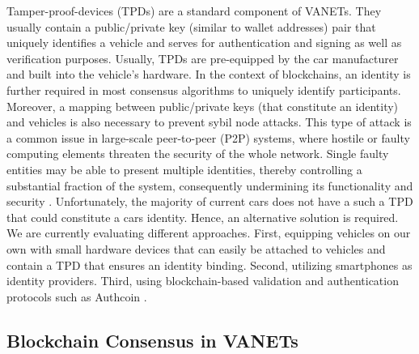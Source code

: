 \documentclass{llncs}
\begin{document}
{			Tamper-proof-devices (TPDs) are a standard component of VANETs. They usually contain a public/private key (similar to wallet addresses) pair that uniquely identifies a vehicle and serves for authentication and signing as well as verification purposes. Usually, TPDs are pre-equipped by the car manufacturer and built into the vehicle's hardware. In the context of blockchains, an identity is further required in most consensus algorithms to uniquely identify participants. Moreover, a mapping between public/private keys (that constitute an identity) and vehicles is also necessary to prevent sybil node attacks. 
			This type of attack is a common issue in large-scale peer-to-peer (P2P) systems, where hostile or faulty computing elements threaten the security of the whole network. Single faulty entities may be able to present multiple identities, thereby controlling a substantial fraction of the system, consequently undermining its functionality and security \cite{douceur2002sybil}.	
			Unfortunately, the majority of current cars does not have a such a TPD that could constitute a cars identity. Hence, an alternative solution is required. We are currently evaluating different approaches. First, equipping vehicles on our own with small hardware devices that can easily be attached to vehicles and contain a TPD that ensures an identity binding. Second, utilizing smartphones as identity providers. Third, using blockchain-based validation and authentication protocols such as Authcoin  \cite{leiding2017securing}\cite{AuthcoinLeiding2016MCIS}\cite{leiding2017mapping}.
		

		\subsection{Blockchain Consensus in VANETs}
			\label{ss:consensus}
			
}
\end{document}
